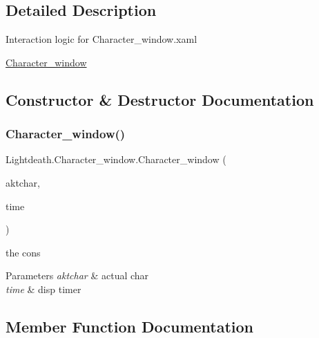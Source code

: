 \subsection{Detailed Description}
Interaction logic for Character\+\_\+window.\+xaml 

\hyperlink{class_lightdeath_1_1_character__window}{Character\+\_\+window} 

\subsection{Constructor \& Destructor Documentation}
\hypertarget{class_lightdeath_1_1_character__window_a0439a34c7f984c017b1680b1e6dded5f}{}\label{class_lightdeath_1_1_character__window_a0439a34c7f984c017b1680b1e6dded5f} 
\subsubsection{\texorpdfstring{Character\+\_\+window()}{Character\_window()}}
{\footnotesize\ttfamily Lightdeath.\+Character\+\_\+window.\+Character\+\_\+window (\begin{DoxyParamCaption}\item[{\hyperlink{class_lightdeath_1_1_character__classes}{Character\+\_\+classes}}]{aktchar,  }\item[{Dispatcher\+Timer}]{time }\end{DoxyParamCaption})\hspace{0.3cm}{\ttfamily [inline]}}



the cons 


\begin{DoxyParams}{Parameters}
{\em aktchar} & actual char\\
\hline
{\em time} & disp timer\\
\hline
\end{DoxyParams}


\subsection{Member Function Documentation}
\hypertarget{class_lightdeath_1_1_character__window_ad8d9797968e3c28a54dbf1c57ac1d59d}{}\label{class_lightdeath_1_1_character__window_ad8d9797968e3c28a54dbf1c57ac1d59d} 
